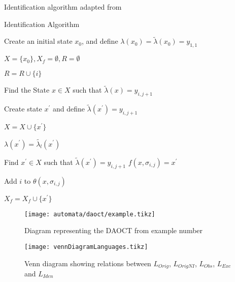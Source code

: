 Identification algorithm adapted from \cite{moreira2018enhanced}
\begin{algorithm2e}
  \caption{Identification Algorithm}\label{alg:identification}
    \BlankLine Create an initial state $x_0$, and define $\lambda(x_0) =
  \tilde{\lambda}(x_0) = y_{1,1}$

  $X = \{ x_0\}, X_f = \emptyset, R = \emptyset$

   { $R = R \cup \{ i \}$
  
     { Find the State $x \in X $ such that
      $\tilde{\lambda}(x) = y_{i,j+1}$

       { Create
        state $x^\prime$ and define $\tilde{\lambda}(x^\prime) = y_{i,j+1}$

        $X = X \cup \{ x^\prime\}$

        $\lambda(x^\prime) = \tilde{\lambda_l}(x^\prime)$

      } { Find $x^\prime \in X$ such that $\tilde{\lambda}(x^\prime) =
        y_{i,j+1}$ } $f(x,\sigma_{i,j}) = x^\prime$

      Add $i$ to $\theta(x,\sigma_{i,j})$

       { $X_f = X_f \cup \{x^\prime\}$ } } }
\end{algorithm2e}



\begin{figure}[H]
  \centering \texttt{[image: automata/daoct/example.tikz]}
  \caption{Diagram representing the DAOCT from example number }
\end{figure}

\usetikzlibrary{patterns}
\begin{figure}[H]
  \centering \texttt{[image: vennDiagramLanguages.tikz]}
  \caption{Venn diagram showing relations between $L_{Orig}$, $L_{OrigNI}$,
    $L_{Obs}$, $L_{Exc}$ and $L_{Iden}$}
\end{figure}


